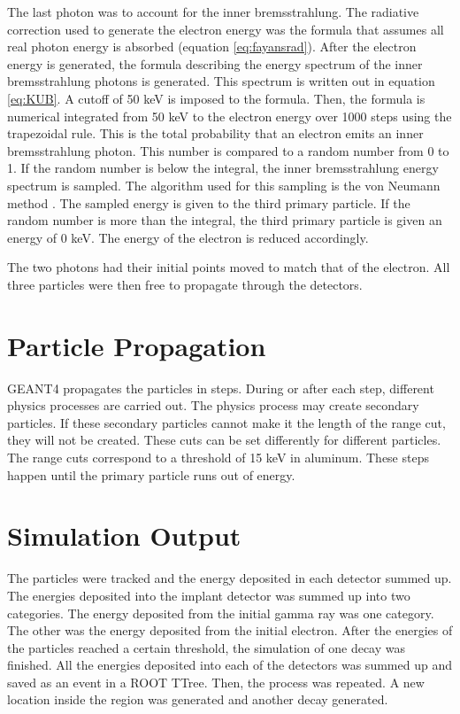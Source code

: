 \documentclass[../MaxHughesThesis.tex]{subfiles}
\begin{document}
The last photon was to account for the inner bremsstrahlung.
The radiative correction used to generate the electron energy was the formula that assumes all real photon energy is absorbed (equation \ref{eq:fayansrad}).
After the electron energy is generated, the formula describing the energy spectrum of the inner bremsstrahlung photons is generated. 
This spectrum is written out in equation \ref{eq:KUB}. %
A cutoff of 50 keV is imposed to the formula.
Then, the formula is numerical integrated from 50 keV to the electron energy over 1000 steps using the trapezoidal rule.
This is the total probability that an electron emits an inner bremsstrahlung photon.
This number is compared to a random number from 0 to 1.
If the random number is below the integral, the inner bremsstrahlung energy spectrum is sampled.
The algorithm used for this sampling is the von Neumann method \cite{neu51}.
The sampled energy is given to the third primary particle.
If the random number is more than the integral, the third primary particle is given an energy of 0 keV.
The energy of the electron is reduced accordingly.

The two photons had their initial points moved to match that of the electron.
All three particles were then free to propagate through the detectors.

\section{Particle Propagation}  
GEANT4 propagates the particles in steps.
During or after each step, different physics processes are carried out.
The physics process may create secondary particles.
If these secondary particles cannot make it the length of the range cut, they will not be created.
These cuts can be set differently for different particles.
The range cuts correspond to a threshold of 15 keV in aluminum.
These steps happen until the primary particle runs out of energy.

\section{Simulation Output}
The particles were tracked and the energy deposited in each detector summed up.
The energies deposited into the implant detector was summed up into two categories.
The energy deposited from the initial gamma ray was one category.
The other was the energy deposited from the initial electron.
After the energies of the particles reached a certain threshold, the simulation of one decay was finished.
All the energies deposited into each of the detectors was summed up and saved as an event in a ROOT TTree.
Then, the process was repeated.
A new location inside the region was generated and another decay generated.
\end{document}
